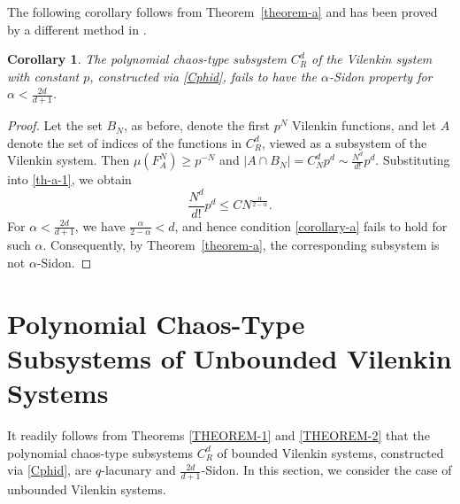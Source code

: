 \documentclass[12pt]{article}
\newtheorem{corollary}{Corollary}
\begin{document}
	The following corollary follows from Theorem~\ref{theorem-a} and has been proved by a different method in \cite[Ch.~VII, \S~11]{Blei}.
	\begin{corollary}
		The polynomial chaos-type subsystem $C^d_R$ of the Vilenkin system with constant $p$, constructed via \eqref{Cphid}, fails to have the $\alpha$-Sidon property for $\alpha < \frac{2d}{d+1}$.
	\end{corollary}
	\begin{proof}
		Let the set $B_N$, as before, denote the first $p^N$ Vilenkin functions, and let $A$ denote the set of indices of the functions in $C^d_R$, viewed as a subsystem of the Vilenkin system. Then $\mu(F_A^N) \ge p^{-N}$ and $|A \cap B_N | = C_N^d p^d \sim \frac{N^d}{d!} p^d$. Substituting into \eqref{th-a-1}, we obtain
		\begin{equation} \label{corollary-a}
			\frac{N^d}{d!} p^d \le C N^{\frac{\alpha}{2-\alpha}}.
		\end{equation}	
		For $\alpha < \frac{2d}{d+1}$, we have $\frac{\alpha}{2-\alpha} < d$, and hence condition \eqref{corollary-a} fails to hold for such $\alpha$. Consequently, by Theorem~\ref{theorem-a}, the corresponding subsystem is not $\alpha$-Sidon.
	\end{proof}
	
\section{Polynomial Chaos-Type Subsystems of Unbounded Vilenkin Systems} \label{section-5}
It readily follows from Theorems \ref{THEOREM-1} and \ref{THEOREM-2} that the polynomial chaos-type subsystems $C^d_R$ of bounded Vilenkin systems, constructed via \eqref{Cphid}, are $q$-lacunary and $\frac{2d}{d+1}$-Sidon. In this section, we consider the case of unbounded Vilenkin systems.
\end{document}
